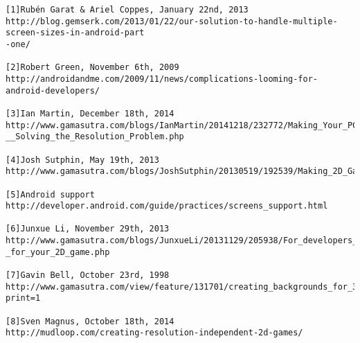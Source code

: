 

	\begin{verbatim}
[1]Rubén Garat & Ariel Coppes, January 22nd, 2013
http://blog.gemserk.com/2013/01/22/our-solution-to-handle-multiple-screen-sizes-in-android-part
-one/ 

[2]Robert Green, November 6th, 2009
http://androidandme.com/2009/11/news/complications-looming-for-android-developers/

[3]Ian Martin, December 18th, 2014
http://www.gamasutra.com/blogs/IanMartin/20141218/232772/Making_Your_PC_Game_Resolution_Agnostic
__Solving_the_Resolution_Problem.php

[4]Josh Sutphin, May 19th, 2013
http://www.gamasutra.com/blogs/JoshSutphin/20130519/192539/Making_2D_Games_With_Unity.php

[5]Android support
http://developer.android.com/guide/practices/screens_support.html

[6]Junxue Li, November 29th, 2013
http://www.gamasutra.com/blogs/JunxueLi/20131129/205938/For_developers_the_right_image_resolution
_for_your_2D_game.php

[7]Gavin Bell, October 23rd, 1998
http://www.gamasutra.com/view/feature/131701/creating_backgrounds_for_3d_games.php?print=1

[8]Sven Magnus, October 18th, 2014 
http://mudloop.com/creating-resolution-independent-2d-games/

\end{verbatim}

